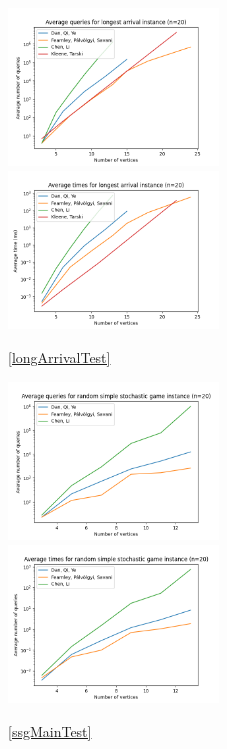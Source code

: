   \begin{figure}[H]
      \centering
      \includegraphics[width=2.2in]{plots/arrival_long_queries.png}
      \centering
      \includegraphics[width=2.2in]{plots/arrival_long_time.png}
      \caption{\cref{longArrivalTest}} \label{arrivalLongPlot}
  \end{figure}
  \begin{figure}[H] 
      \centering
      \includegraphics[width=2.2in]{plots/simple_queries.png}
      \centering
      \includegraphics[width=2.2in]{plots/simple_time.png}
      \caption{\cref{ssgMainTest}} \label{simpleMainPlot}
  \end{figure}
